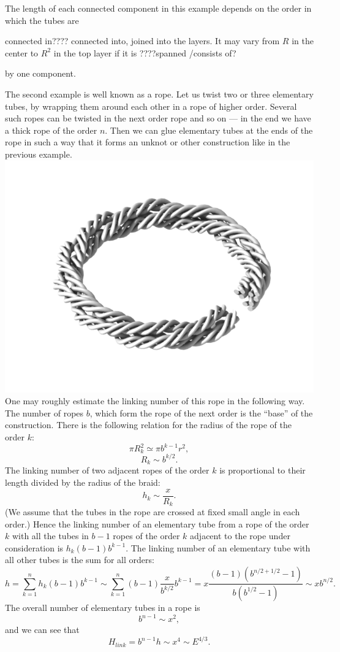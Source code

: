 \documentclass[a4paper,12pt]{article}
\begin{document}
	The length of each connected component in this example depends
	on the order in which the tubes are 

connected in???? connected into, joined into
the layers.
	It may vary from 
    $ R $ 
	in the center to 
    $ R^{2} $
	in the top layer if it is 
????spanned /consists of?

by one component.

	The second example is well known as a rope.
        Let us twist two or three elementary tubes, by wrapping 
        them around each other in a rope of higher order. 
	Several such ropes can be twisted 
        in the next order rope and so on --- in the end we have a thick rope
        of the order 
    $ n $. 
	Then we can glue elementary tubes at the ends 
        of the rope in such a way that it forms an unknot or other construction
	like in the previous example.
\includegraphics[40,40]{x1.gif}
        One may roughly estimate the linking number of this rope in
        the following way.
        The number of ropes $ b $, which form the rope of the next order 
        is the ``base'' of the construction. 
	There is the following relation for the radius of the rope of the
        order $ k$:
$$ \pi R^{2}_{k} \simeq \pi b^{k-1} r^{2} ,$$
$$ R_{k} \sim b^{k/2} .$$
        The linking number of two adjacent ropes of the order $ k$ 
        is proportional to their length divided by the radius 
        of the braid:
$$ h_{k} \sim \frac{x}{R_{k}} .$$
        (We assume that the tubes in the rope are crossed at fixed small angle
        in each order.) 
        Hence the linking number of an elementary tube from a rope of the
        order $ k$ with all the tubes in $ b-1 $ ropes
        of the order $ k $ adjacent to the rope under consideration is 
    $ h_{k} (b-1) b^{k-1} $. 
	The linking number of an elementary
        tube with all other tubes is the sum for all orders:
$$ h = \sum^{n}_{k=1} h_{k} (b-1) b^{k-1} \sim
        \sum^{n}_{k=1} (b-1) \frac{x}{b^{k/2}} b^{k-1}
        = x \frac{ (b-1) (b^{n/2+1/2} -1)}{b(b^{1/2} -1)} \sim x b^{n/2}. $$
        The overall number of elementary tubes in a rope is
$$ b^{n-1} \sim x^{2}, $$
        and we can see that
$$ H_{link} = b^{n-1} h \sim x^{4} \sim E^{4/3} .$$
\end{document}
